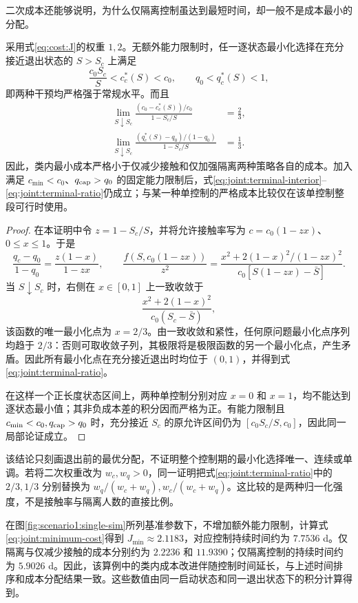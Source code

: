 \documentclass[lang=cn,a4paper,newtx]{elegantpaper}
\numberwithin{equation}{section}
\theoremstyle{plain}
\begin{document}
二次成本还能够说明，为什么仅隔离控制虽达到最短时间，却一般不是成本最小的分配。
\begin{proposition}
\label{prop:joint:terminal-allocation}
采用式\eqref{eq:cost:J}的权重 $1,2$。无额外能力限制时，任一逐状态最小化选择在充分接近退出状态的 $S>S_c$ 上满足
\begin{equation}
\frac{c_0S_c}{S}<c_c^*(S)<c_0,
\qquad q_0<q_c^*(S)<1,
\label{eq:joint:terminal-interior}
\end{equation}
即两种干预均严格强于常规水平。而且
\begin{equation}
\begin{aligned}
\lim_{S\downarrow S_c}
\frac{(c_0-c_c^*(S))/c_0}{1-S_c/S}&=\frac23,\\
\lim_{S\downarrow S_c}
\frac{(q_c^*(S)-q_0)/(1-q_0)}{1-S_c/S}&=\frac13.
\end{aligned}
\label{eq:joint:terminal-ratio}
\end{equation}
因此，类内最小成本严格小于仅减少接触和仅加强隔离两种策略各自的成本。加入满足 $c_{\min}<c_0$、$q_{\rm cap}>q_0$ 的固定能力限制后，式\eqref{eq:joint:terminal-interior}--\eqref{eq:joint:terminal-ratio}仍成立；与某一种单控制的严格成本比较仅在该单控制整段可行时使用。
\end{proposition}
\begin{proof}
在本证明中令 $z=1-S_c/S$，并将允许接触率写为
$c=c_0(1-zx)$、$0\le x\le1$。于是
\[
\frac{q_c-q_0}{1-q_0}=\frac{z(1-x)}{1-zx},\qquad
\frac{f(S,c_0(1-zx))}{z^2}
=\frac{x^2+2(1-x)^2/(1-zx)^2}
{c_0[S(1-zx)-\bar S]}.
\]
当 $S\downarrow S_c$ 时，右侧在 $x\in[0,1]$ 上一致收敛于
\[
\frac{x^2+2(1-x)^2}{c_0(S_c-\bar S)},
\]
该函数的唯一最小化点为 $x=2/3$。由一致收敛和紧性，任何原问题最小化点序列均趋于 $2/3$：否则可取收敛子列，其极限将是极限函数的另一个最小化点，产生矛盾。因此所有最小化点在充分接近退出时均位于 $(0,1)$，并得到式\eqref{eq:joint:terminal-ratio}。

在这样一个正长度状态区间上，两种单控制分别对应 $x=0$ 和 $x=1$，均不能达到逐状态最小值；其非负成本差的积分因而严格为正。有能力限制且 $c_{\min}<c_0,q_{\rm cap}>q_0$ 时，充分接近 $S_c$ 的原允许区间仍为 $[c_0S_c/S,c_0]$，因此同一局部论证成立。
\end{proof}
该结论只刻画退出前的最优分配，不证明整个控制期的最小化选择唯一、连续或单调。若将二次权重改为 $w_c,w_q>0$，同一证明把式\eqref{eq:joint:terminal-ratio}中的 $2/3,1/3$ 分别替换为 $w_q/(w_c+w_q),w_c/(w_c+w_q)$。这比较的是两种归一化强度，不是接触率与隔离人数的直接比例。

在图\ref{fig:scenario1:single-sim}所列基准参数下，不增加额外能力限制，计算式\eqref{eq:joint:minimum-cost}得到 $J_{\min}\approx2.1183$，对应控制持续时间约为 $7.7536$ d。仅隔离与仅减少接触的成本分别约为 $2.2236$ 和 $11.9390$；仅隔离控制的持续时间约为 $5.9026$ d。因此，该算例中的类内成本改进伴随控制时间延长，与上述时间排序和成本分配结果一致。这些数值由同一启动状态和同一退出状态下的积分计算得到。
\end{document}
